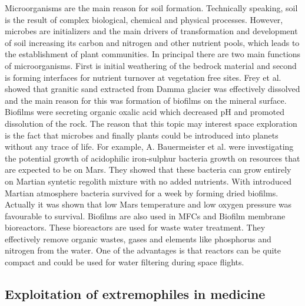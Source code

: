 \documentclass[12pt]{article}
\begin{document}
Microorganisms are the main reason for soil formation. Technically speaking, soil is the result
of complex biological, chemical and physical processes. However, microbes are initializers and
the main drivers of transformation and development of soil increasing its carbon and nitrogen
and other nutrient pools, which leads to the establishment of plant communities. In principal
there are two main functions of microorganisms. First is initial weathering of the bedrock
material and second is forming interfaces for nutrient turnover at vegetation free sites. Frey et
al. showed that granitic sand extracted from Damma glacier was effectively dissolved and the
main reason for this was formation of biofilms on the mineral surface. Biofilms were secreting
organic oxalic acid which decreased pH and promoted dissolution of the rock. The reason that
this topic may interest space exploration is the fact that microbes and finally plants could be
introduced into planets without any trace of life. For example, A. Bauermeister et al. were
investigating the potential growth of acidophilic iron-sulphur bacteria growth on resources that
are expected to be on Mars. They showed that these bacteria can grow entirely on Martian
syntetic regolith mixture with no added nutrients. With introduced Martian atmosphere bacteria
survived for a week by forming dried biofilms. Actually it was shown that low Mars
temperature and low oxygen pressure was favourable to survival. Biofilms are also used in
MFCs and Biofilm membrane bioreactors. These bioreactors are used for waste water treatment.
They effectively remove organic wastes, gases and elements like phosphorus and nitrogen from
the water. One of the advantages is that reactors can be quite compact and could be used for
water filtering during space flights.

\subsection{Exploitation of extremophiles in medicine}
\end{document}

